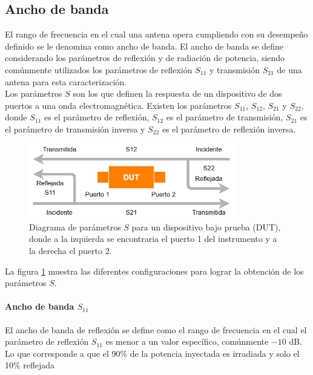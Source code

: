\subsection{Ancho de banda}

El rango de frecuencia en el cual una antena opera cumpliendo con su desempeño definido se le denomina como ancho de banda. El ancho de banda se define considerando los parámetros de reflexión y de radiación de potencia, siendo comúnmente utilizados los parámetros de reflexión $S_{11}$ y transmisión $S_{21}$ de una antena para esta caracterización.\\

Los parámetros $S$ son los que definen la respuesta de un dispositivo de dos puertos a una onda electromagnética. Existen los parámetros $S_{11}$, $S_{12}$, $S_{21}$ y $S_{22}$, donde $S_{11}$ es el parámetro de reflexión, $S_{12}$ es el parámetro de transmisión, $S_{21}$ es el parámetro de transmisión inversa y $S_{22}$ es el parámetro de reflexión inversa.\\

\begin{figure}
    \centering
    \includegraphics[width = 0.8\textwidth]{img/bloquesS.png}
    \caption{Diagrama de parámetros $S$ para un dispositivo bajo prueba (DUT), donde a la izquierda se encontraria el puerto 1 del instrumento y a la derecha el puerto 2.}
    \label{fig:sparam}
\end{figure}

La figura \ref{fig:sparam} muestra las diferentes configuraciones para lograr la obtención de los parámetros $S$.\\

\paragraph{Ancho de banda $S_{11}$} El ancho de banda de reflexión se define como el rango de frecuencia en el cual el parámetro de reflexión $S_{11}$ es menor a un valor específico, comúnmente $-10$ dB. Lo que corresponde a que el 90\% de la potencia inyectada es irradiada y solo el 10\% reflejada\\


